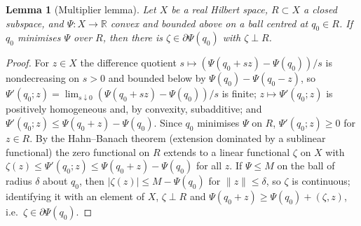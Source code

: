 \documentclass[11pt]{amsart}
\newtheorem{lemma}[theorem]{Lemma}
\theoremstyle{definition}
\theoremstyle{remark}
\numberwithin{equation}{section}
\newcommand{\R}{\mathbb{R}}
\newcommand{\abs}[1]{\lvert #1\rvert}
\newcommand{\norm}[1]{\lVert #1\rVert}
\begin{document}
\begin{lemma}[Multiplier lemma]\label{lem:multiplier}
Let $X$ be a real Hilbert space, $R\subset X$ a closed subspace, and $\Psi\colon X\to\R$ convex and bounded above on a ball centred at $q_0\in R$. If $q_0$ minimises $\Psi$ over $R$, then there is $\zeta\in\partial\Psi(q_0)$ with $\zeta\perp R$.
\end{lemma}
\begin{proof}
For $z\in X$ the difference quotient $s\mapsto(\Psi(q_0+sz)-\Psi(q_0))/s$ is nondecreasing on $s>0$ and bounded below by $\Psi(q_0)-\Psi(q_0-z)$, so $\Psi'(q_0;z)=\lim_{s\downarrow0}(\Psi(q_0+sz)-\Psi(q_0))/s$ is finite; $z\mapsto\Psi'(q_0;z)$ is positively homogeneous and, by convexity, subadditive; and $\Psi'(q_0;z)\le\Psi(q_0+z)-\Psi(q_0)$. Since $q_0$ minimises $\Psi$ on $R$, $\Psi'(q_0;z)\ge0$ for $z\in R$. By the Hahn--Banach theorem (extension dominated by a sublinear functional) the zero functional on $R$ extends to a linear functional $\zeta$ on $X$ with $\zeta(z)\le\Psi'(q_0;z)\le\Psi(q_0+z)-\Psi(q_0)$ for all $z$. If $\Psi\le M$ on the ball of radius $\delta$ about $q_0$, then $\abs{\zeta(z)}\le M-\Psi(q_0)$ for $\norm z\le\delta$, so $\zeta$ is continuous; identifying it with an element of $X$, $\zeta\perp R$ and $\Psi(q_0+z)\ge\Psi(q_0)+(\zeta,z)$, i.e.\ $\zeta\in\partial\Psi(q_0)$.
\end{proof}
\end{document}
